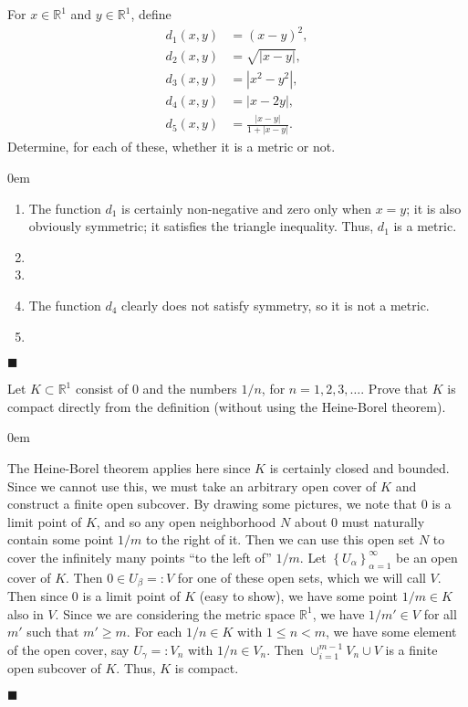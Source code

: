 \documentclass[12pt]{article}
\renewcommand{\qed}{\hfill$\blacksquare$}
\renewenvironment{proof}{\begin{addmargin}[1em]{0em}\begin{newproof}}{\end{newproof}\end{addmargin}\qed}
\newenvironment{problem}[2][Exercise]{\begin{trivlist}
\item[\hskip \labelsep {\bfseries #1}\hskip \labelsep {\bfseries #2.}]}{\end{trivlist}}
\begin{document}
\begin{problem}{2.11}
For $x\in \mathbb{R}^1$ and $y\in \mathbb{R}^1$, define \begin{align*}
d_1\left(x,y\right) & = \left(x-y\right)^2, \\
d_2\left(x,y\right) & = \sqrt{\left|x-y\right|}, \\
d_3\left(x,y\right) & = \left|x^2-y^2\right|, \\
d_4\left(x,y\right) & = \left|x-2y\right|,\\
d_5\left(x,y\right) & = \frac{\left|x-y\right|}{1+\left|x-y\right|}.
\end{align*} Determine, for each of these, whether it is a metric or not.
\end{problem}
\begin{proof}
\begin{enumerate}
	\item The function $d_1$ is certainly non-negative and zero only when $x=y$; it is also obviously symmetric; it satisfies the triangle inequality. Thus, $d_1$ is a metric.
	\item 
	\item
	\item The function $d_4$ clearly does not satisfy symmetry, so it is not a metric.
	\item 
\end{enumerate}
\end{proof}











\begin{problem}{2.12}
Let $K\subset \mathbb{R}^1$ consist of $0$ and the numbers $1/n$, for $n=1,2,3,\ldots $. Prove that $K$ is compact directly from the definition (without using the Heine-Borel theorem).
\end{problem}
\begin{proof}
{\color{red}The Heine-Borel theorem applies here since $K$ is certainly closed and bounded. Since we cannot use this, we must take an arbitrary open cover of $K$ and construct a finite open subcover. By drawing some pictures, we note that $0$ is a limit point of $K$, and so any open neighborhood $N$ about $0$ must naturally contain some point $1/m$ to the right of it. Then we can use this open set $N$ to cover the infinitely many points ``to the left of'' $1/m$. } Let $\left\{U_{\alpha}\right\}_{\alpha =1}^{\infty}$ be an open cover of $K$. Then $0\in U_{\beta}=:V $ for one of these open sets, which we will call $V$. Then since $0$ is a limit point of $K$ {\color{red}(easy to show)}, we have some point $1/m \in K$ also in $V$. Since we are considering the metric space $\mathbb{R}^1$, we have $1/m' \in V$ for all $ m' $ such that $m' \geq m$. For each $1/n \in K$ with $1\leq n < m$, we have some element of the open cover, say $U_{\gamma}=:V_n$ with $1/n \in V_n$. Then $\cup_{i=1}^{m-1} V_n \cup V $ is a finite open subcover of $K$. Thus, $K$ is compact.
\end{proof}
\end{document}
